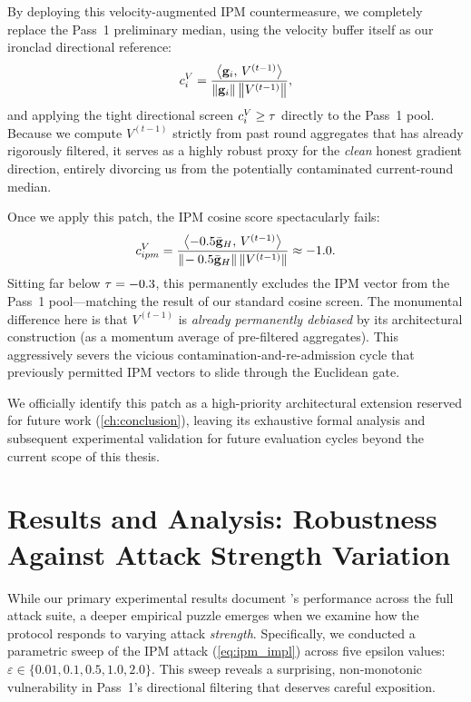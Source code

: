 \documentclass[../main.tex]{subfiles}
\begin{document}
By deploying this velocity-augmented IPM countermeasure, we completely replace the Pass~1 preliminary median, using the velocity buffer itself as our ironclad directional reference:
\begin{equation}
    c_i^{V} = \frac{\left\langle \mathbf{g}_{i},\, V^{(t-1)} \right\rangle}{\left\lVert \mathbf{g}_{i} \right\rVert\left\lVert V^{(t-1)} \right\rVert},
    \label{eq:velocity_cosine}
\end{equation}
and applying the tight directional screen $c_i^{V} \geq \tau$ directly to the Pass~1 pool. Because we compute $V^{(t-1)}$ strictly from past round aggregates that \aegis{} has already rigorously filtered, it serves as a highly robust proxy for the \emph{clean} honest gradient direction, entirely divorcing us from the potentially contaminated current-round median.

Once we apply this patch, the IPM cosine score spectacularly fails:
\begin{equation}
    c_{ipm}^{V} = \frac{\left\langle -0.5\bar{\mathbf{g}}_{H},\, V^{(t-1)} \right\rangle}{\|\!-0.5\bar{\mathbf{g}}_{H}\|\,\|V^{(t-1)}\|} \approx -1.0.
    \label{eq:ipm_velocity_cosine}
\end{equation}
Sitting far below $\tau = -0.3$, this permanently excludes the IPM vector from the Pass~1 pool---matching the result of our standard cosine screen. The monumental difference here is that $V^{(t-1)}$ is \emph{already permanently debiased} by its architectural construction (as a momentum average of pre-filtered aggregates). This aggressively severs the vicious contamination-and-re-admission cycle that previously permitted IPM vectors to slide through the Euclidean gate.

We officially identify this patch as a high-priority architectural extension reserved for future work (\cref{ch:conclusion}), leaving its exhaustive formal analysis and subsequent experimental validation for future evaluation cycles beyond the current scope of this thesis.

\section{Results and Analysis: Robustness Against Attack Strength Variation}
\label{sec:results_analysis}

While our primary experimental results document \aegis{}'s performance across the full attack suite, a deeper empirical puzzle emerges when we examine how the protocol responds to varying attack \emph{strength}. Specifically, we conducted a parametric sweep of the IPM attack (\cref{eq:ipm_impl}) across five epsilon values: $\varepsilon \in \{0.01, 0.1, 0.5, 1.0, 2.0\}$. This sweep reveals a surprising, non-monotonic vulnerability in Pass~1's directional filtering that deserves careful exposition.
\end{document}

